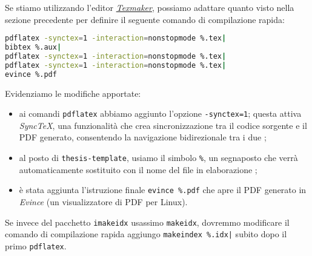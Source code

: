 Se stiamo utilizzando l'editor \href{https://www.xm1math.net/texmaker/}{\textit{Texmaker}}, possiamo adattare quanto visto nella sezione precedente per definire il seguente comando di compilazione rapida:

\begin{lstlisting}[language=bash]
pdflatex -synctex=1 -interaction=nonstopmode %.tex|
bibtex %.aux|
pdflatex -synctex=1 -interaction=nonstopmode %.tex|
pdflatex -synctex=1 -interaction=nonstopmode %.tex|
evince %.pdf
\end{lstlisting}

\medskip

Evidenziamo le modifiche apportate:
\begin{itemize}

\item ai comandi \texttt{pdflatex} abbiamo aggiunto l'opzione \texttt{-synctex=1}; questa attiva \textit{SyncTeX}, una funzionalità che crea sincronizzazione tra il codice sorgente e il PDF generato, consentendo la navigazione bidirezionale tra i due \cite{texmaker2023manual};

\item al posto di \texttt{thesis-template}, usiamo il simbolo \texttt{\%}, un segnaposto che verrà automaticamente sostituito con il nome del file in elaborazione \cite{texmaker2023manual};

\item è stata aggiunta l'istruzione finale \texttt{evince \%.pdf} che apre il PDF generato in \textit{Evince} (un visualizzatore di PDF per Linux).

\end{itemize}

Se invece del pacchetto \texttt{imakeidx} usassimo \texttt{makeidx}, dovremmo modificare il comando di compilazione rapida aggiungo \texttt{makeindex \%.idx|} subito dopo il primo \texttt{pdflatex}.